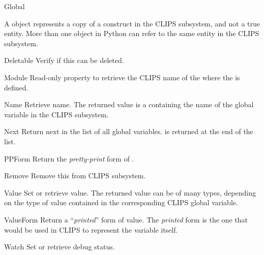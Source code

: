 \begin{classdesc*}{Global}

A  object represents a copy of a  construct
in the CLIPS subsystem, and not a true  entity. More
than one  object in Python can refer to the same
 entity in the CLIPS subsystem.

\begin{memberdesc}[property]{Deletable}
Verify if this  can be deleted.
\end{memberdesc}

\begin{memberdesc}[property]{Module}
Read-only property to retrieve the CLIPS name of the 
where the  is defined.
\end{memberdesc}

\begin{memberdesc}[property]{Name}
Retrieve  name. The returned value is a 
containing the name of the global variable in the CLIPS subsystem.
\end{memberdesc}

\begin{methoddesc}{Next}{}
Return next  in the list of all global variables. 
is returned at the end of the list.
\end{methoddesc}

\begin{methoddesc}{PPForm}{}
Return the \emph{pretty-print} form of .
\end{methoddesc}

\begin{methoddesc}{Remove}{}
Remove this  from CLIPS subsystem.
\end{methoddesc}

\begin{memberdesc}[property]{Value}
Set or retrieve  value. The returned value can be of many
types, depending on the type of value contained in the corresponding
CLIPS global variable.
\end{memberdesc}

\begin{methoddesc}{ValueForm}{}
Return a ``\emph{printed}'' form of  value. The
\emph{printed} form is the one that would be used in CLIPS to represent
the variable itself.
\end{methoddesc}

\begin{memberdesc}[property]{Watch}
Set or retrieve  debug status.
\end{memberdesc}


\end{classdesc*}
